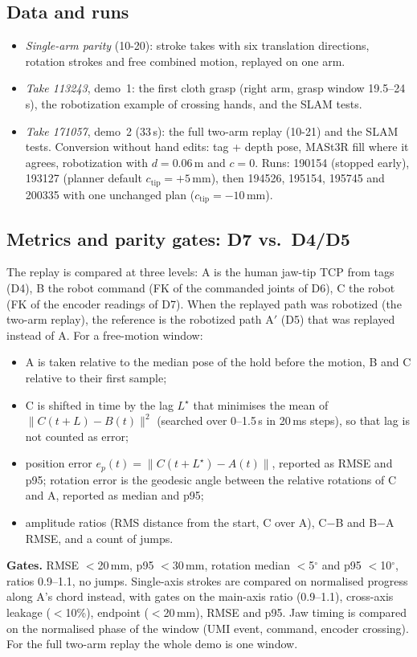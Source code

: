 \documentclass[conference,10pt]{IEEEtran}
\newcommand{\mm}{\,mm\xspace}
\begin{document}
\subsection{Data and runs}\label{sec:data}
\begin{itemize}
\item \emph{Single-arm parity} (10-20): stroke takes with six translation directions, rotation strokes and free combined
  motion, replayed on one arm.
\item \emph{Take 113243}, demo~1: the first cloth grasp (right arm, grasp window 19.5--24\,s), the robotization example of
  crossing hands, and the SLAM tests.
\item \emph{Take 171057}, demo~2 (33\,s): the full two-arm replay (10-21) and the SLAM tests. Conversion without hand
  edits: tag + depth pose, MASt3R fill where it agrees, robotization with $d=0.06$\,m and $c=0$. Runs: 190154 (stopped
  early), 193127 (planner default $c_\mathrm{tip}=+5$\mm), then 194526, 195154, 195745 and 200335 with one unchanged plan
  ($c_\mathrm{tip}=-10$\mm).
\end{itemize}

\subsection{Metrics and parity gates: D7 vs.\ D4/D5}\label{sec:eval}
The replay is compared at three levels: A is the human jaw-tip TCP from tags (D4), B the robot command (FK of
the commanded joints of D6), C the robot (FK of the encoder readings of D7). When the replayed path was robotized (the
two-arm replay), the reference is the robotized path A$'$ (D5) that was replayed instead of A. For a free-motion window:
\begin{itemize}
\item A is taken relative to the median pose of the hold before the motion, B and C relative to their first sample;
\item C is shifted in time by the lag $L^\star$ that minimises the mean of $\lVert C(t+L)-B(t)\rVert^2$ (searched over
  0--1.5\,s in 20\,ms steps), so that lag is not counted as error;
\item position error $e_p(t)=\lVert C(t+L^\star)-A(t)\rVert$, reported as RMSE and p95; rotation error is the geodesic
  angle between the relative rotations of C and A, reported as median and p95;
\item amplitude ratios (RMS distance from the start, C over A), C$-$B and B$-$A RMSE, and a count of jumps.
\end{itemize}
\textbf{Gates.} RMSE $<$20\mm, p95 $<$30\mm, rotation median $<$5$^\circ$ and p95 $<$10$^\circ$, ratios 0.9--1.1, no jumps.
Single-axis strokes are compared on normalised progress along A's chord instead, with gates on the main-axis ratio
(0.9--1.1), cross-axis leakage ($<$10\%), endpoint ($<$20\mm), RMSE and p95. Jaw timing is compared on the normalised phase
of the window (UMI event, command, encoder crossing). For the full two-arm replay the whole demo is one window.
\end{document}
